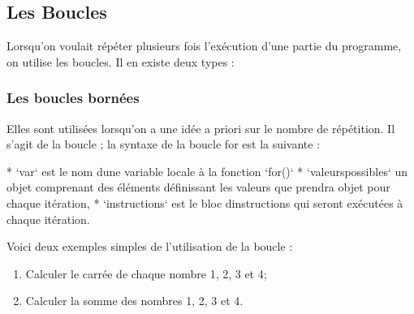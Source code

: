 \documentclass[letterpaper,10pt,french]{sphinxmanual}
\begin{document}
\subsection{Les Boucles}
\label{\detokenize{ch2:les-boucles}}
\sphinxAtStartPar
Lorsqu’on voulait répéter plusieurs fois l’exécution d’une partie du programme, on utilise les boucles. Il en existe deux types :


\subsubsection{Les boucles bornées}
\label{\detokenize{ch2:les-boucles-bornees}}
\sphinxAtStartPar
Elles sont utilisées lorsqu’on a une idée a priori sur le nombre de répétition. Il s’agit de la boucle  ; la syntaxe de la boucle for est la suivante :

\begin{sphinxVerbatim}[commandchars=\\\{\}]
   
\end{sphinxVerbatim}

\begin{sphinxVerbatim}[commandchars=\\\{\}]
* `var` est le nom d\PYGZsq{}une variable locale à la fonction `for()` 
* `valeurs\PYGZus{}possibles` un objet comprenant des éléments définissant les valeurs que prendra objet pour chaque itération, 
*  `instructions` est le bloc d\PYGZsq{}instructions qui seront exécutées à chaque itération.
\end{sphinxVerbatim}

\sphinxAtStartPar
Voici deux exemples simples de l’utilisation de la boucle  :
\begin{enumerate}
%
\item {} 
\sphinxAtStartPar
Calculer le carrée de chaque nombre 1, 2, 3 et 4;

\item {} 
\sphinxAtStartPar
Calculer la somme des nombres 1, 2, 3 et 4.

\end{enumerate}

\begin{sphinxVerbatim}[commandchars=\\\{\}]
   \PYG{p}{[}   \PYG{p}{]}
       
\end{sphinxVerbatim}
\end{document}
